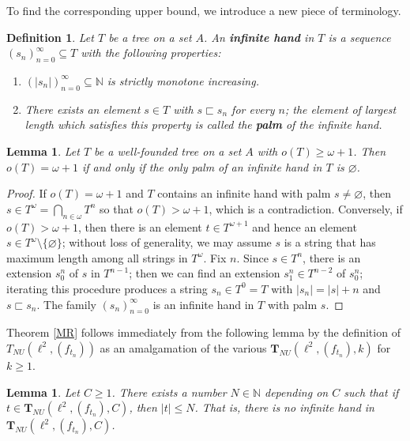 \documentclass{article}
\newtheorem{lemma}[theorem]{Lemma}
\newtheorem{definition}[theorem]{Definition}
\newcommand{\N}{\mathbb N}
\begin{document}
To find the corresponding upper bound, we introduce a new piece of terminology.

\begin{definition}
Let $T$ be a tree on a set $A$. An \textbf{infinite hand} in $T$ is a sequence $(s_n)_{n=0}^\infty\subseteq T$ with the following properties:
\begin{enumerate}
\item $(|s_n|)_{n=0}^\infty\subseteq\N$ is strictly monotone increasing.
\item There exists an element $s\in T$ with $s\sqsubset s_n$ for every $n$; the element of largest length which satisfies this property is called the \textbf{palm} of the infinite hand.
\end{enumerate}
\end{definition}

\begin{lemma}
Let $T$ be a well-founded tree on a set $A$ with $o(T)\geq\omega+1$. Then $o(T) = \omega+1$ if and only if the only palm of an infinite hand in $T$ is $\varnothing$.
\end{lemma}

\begin{proof}
If $o(T) = \omega+1$ and $T$ contains an infinite hand with palm $s\neq\varnothing$, then $s\in T^\omega = \bigcap_{n\in\omega} T^n$ so that $o(T) > \omega+1$, which is a contradiction. Conversely, if $o(T) > \omega+1$, then there is an element $t\in T^{\omega+1}$ and hence an element $s\in T^\omega\setminus\{\varnothing\}$; without loss of generality, we may assume $s$ is a string that has maximum length among all strings in $T^\omega$. Fix $n$. Since $s\in T^n$, there is an extension $s_0^n$ of $s$ in $T^{n-1}$; then we can find an extension $s_1^n\in T^{n-2}$ of $s_0^n$; iterating this procedure produces a string $s_n\in T^0 = T$ with $|s_n| = |s| + n$ and $s\sqsubset s_n$. The family $(s_n)_{n=0}^\infty$ is an infinite hand in $T$ with palm $s$.
\end{proof}

Theorem \ref{MR} follows immediately from the following lemma by the definition of $T_{NU}(\ell^2, (f_{t_n}))$ as an amalgamation of the various $\textbf{T}_{NU}(\ell^2, (f_{t_n}), k)$ for $k\geq 1$.

\begin{lemma}\label{ML}
Let $C\geq 1$. There exists a number $N\in\N$ depending on $C$ such that if $t\in\textbf{T}_{NU}(\ell^2, (f_{t_n}),C)$, then $|t|\leq N$. That is, there is no infinite hand in $\textbf{T}_{NU}(\ell^2, (f_{t_n}),C)$.
\end{lemma}
\end{document}
